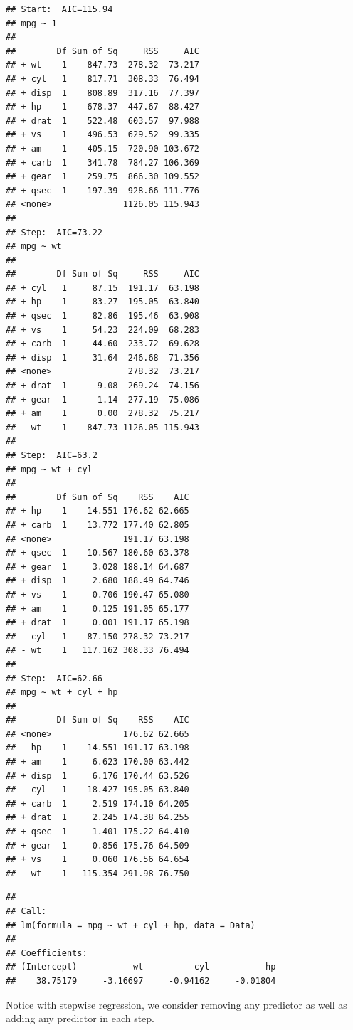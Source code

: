 \documentclass[
]{book}
\begin{document}
\begin{verbatim}
## Start:  AIC=115.94
## mpg ~ 1
## 
##        Df Sum of Sq     RSS     AIC
## + wt    1    847.73  278.32  73.217
## + cyl   1    817.71  308.33  76.494
## + disp  1    808.89  317.16  77.397
## + hp    1    678.37  447.67  88.427
## + drat  1    522.48  603.57  97.988
## + vs    1    496.53  629.52  99.335
## + am    1    405.15  720.90 103.672
## + carb  1    341.78  784.27 106.369
## + gear  1    259.75  866.30 109.552
## + qsec  1    197.39  928.66 111.776
## <none>              1126.05 115.943
## 
## Step:  AIC=73.22
## mpg ~ wt
## 
##        Df Sum of Sq     RSS     AIC
## + cyl   1     87.15  191.17  63.198
## + hp    1     83.27  195.05  63.840
## + qsec  1     82.86  195.46  63.908
## + vs    1     54.23  224.09  68.283
## + carb  1     44.60  233.72  69.628
## + disp  1     31.64  246.68  71.356
## <none>               278.32  73.217
## + drat  1      9.08  269.24  74.156
## + gear  1      1.14  277.19  75.086
## + am    1      0.00  278.32  75.217
## - wt    1    847.73 1126.05 115.943
## 
## Step:  AIC=63.2
## mpg ~ wt + cyl
## 
##        Df Sum of Sq    RSS    AIC
## + hp    1    14.551 176.62 62.665
## + carb  1    13.772 177.40 62.805
## <none>              191.17 63.198
## + qsec  1    10.567 180.60 63.378
## + gear  1     3.028 188.14 64.687
## + disp  1     2.680 188.49 64.746
## + vs    1     0.706 190.47 65.080
## + am    1     0.125 191.05 65.177
## + drat  1     0.001 191.17 65.198
## - cyl   1    87.150 278.32 73.217
## - wt    1   117.162 308.33 76.494
## 
## Step:  AIC=62.66
## mpg ~ wt + cyl + hp
## 
##        Df Sum of Sq    RSS    AIC
## <none>              176.62 62.665
## - hp    1    14.551 191.17 63.198
## + am    1     6.623 170.00 63.442
## + disp  1     6.176 170.44 63.526
## - cyl   1    18.427 195.05 63.840
## + carb  1     2.519 174.10 64.205
## + drat  1     2.245 174.38 64.255
## + qsec  1     1.401 175.22 64.410
## + gear  1     0.856 175.76 64.509
## + vs    1     0.060 176.56 64.654
## - wt    1   115.354 291.98 76.750
\end{verbatim}

\begin{verbatim}
## 
## Call:
## lm(formula = mpg ~ wt + cyl + hp, data = Data)
## 
## Coefficients:
## (Intercept)           wt          cyl           hp  
##    38.75179     -3.16697     -0.94162     -0.01804
\end{verbatim}

Notice with stepwise regression, we consider removing any predictor as well as adding any predictor in each step.
\end{document}
